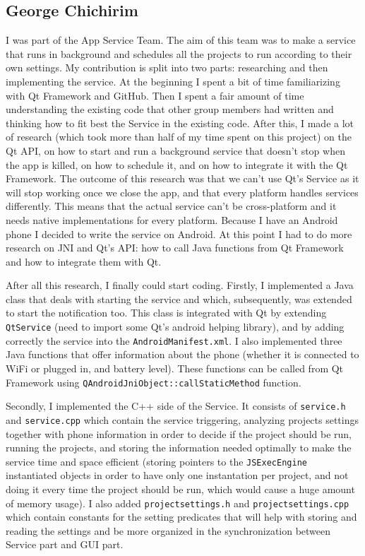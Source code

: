 \documentclass{article}
\begin{document}
\subsection{George Chichirim}
I was part of the App Service Team. The aim of this team was to make a service that runs in background and schedules all the projects to run according to their own settings. My contribution is split into two parts: researching and then implementing the service. At the beginning I spent a bit of time familiarizing with Qt Framework and GitHub. Then I spent a fair amount of time understanding the existing code that other group members had written and thinking how to fit best the Service in the existing code. After this, I made a lot of research (which took more than half of my time spent on this project) on the Qt API, on how to start and run a background service that doesn't stop when the app is killed, on how to schedule it, and on how to integrate it with the Qt Framework. The outcome of this research was that we can't use Qt's Service as it will stop working once we close the app, and that every platform handles services differently. This means that the actual service can't be cross-platform and it needs native implementations for every platform. Because I have an Android phone I decided to write the service on Android. At this point I had to do more research on JNI and Qt's API: how to call Java functions from Qt Framework and how to integrate them with Qt.

After all this research, I finally could start coding. Firstly, I implemented a Java class that deals with starting the service and which, subsequently, was extended to start the notification too. This class is integrated with Qt by extending \texttt{QtService} (need to import some Qt's android helping library), and by adding correctly the service into the \texttt{AndroidManifest.xml}. I also implemented three Java functions that offer information about the phone (whether it is connected to WiFi or plugged in, and battery level). These functions can be called from Qt Framework using \texttt{QAndroidJniObject::callStaticMethod} function.

Secondly, I implemented the C++ side of the Service. It consists of \texttt{service.h} and \texttt{service.cpp} which contain the service triggering, analyzing projects settings together with phone information in order to decide if the project should be run, running the projects, and storing the information needed optimally to make the service time and space efficient (storing pointers to the \texttt{JSExecEngine} instantiated objects in order to have only one instantation per project, and not doing it every time the project should be run, which would cause a huge amount of memory usage). I also added \texttt{projectsettings.h} and \texttt{projectsettings.cpp} which contain constants for the setting predicates that will help with storing and reading the settings and be more organized in the synchronization between Service part and GUI part.
\end{document}
